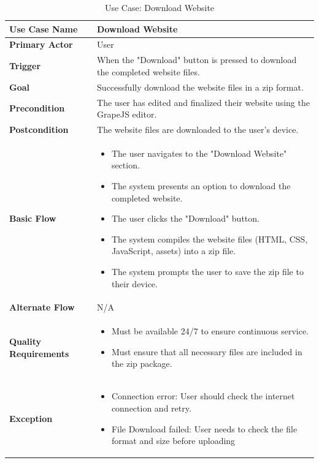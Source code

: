 \documentclass[12pt]{report}
\begin{document}
\clearpage
\begin{table}[h!]

\begin{tabular}{|p{3.5cm}|p{10cm}|}
\hline
\textbf{Use Case Name} & Download Website \\ 
\hline
\textbf{Primary Actor} & User  \\ 
\hline
\textbf{Trigger} & When the "Download" button is pressed to download the completed website files. \\ 
\hline
\textbf{Goal} & Successfully download the website files in a zip format. \\ 
\hline
\textbf{Precondition} & The user has edited and finalized their website using the GrapeJS editor. \\ 
\hline
\textbf{Postcondition} & The website files are downloaded to the user's device. \\ 
\hline
\textbf{Basic Flow} & 
\begin{itemize}
    \item The user navigates to the "Download Website" section.
    \item The system presents an option to download the completed website.
    \item The user clicks the "Download" button.
    \item The system compiles the website files (HTML, CSS, JavaScript, assets) into a zip file.
    \item The system prompts the user to save the zip file to their device.
\end{itemize} \\ 
\hline
\textbf{Alternate Flow} & N/A \\ 
\hline
\textbf{Quality Requirements} & 
\begin{itemize}
    \item Must be available 24/7 to ensure continuous service.
    \item Must ensure that all necessary files are included in the zip package.
\end{itemize} \\ 
\hline
\textbf{Exception} & 
\begin{itemize}
    \item Connection error: User should check the internet connection and retry.
    \item File Download failed: User needs to check the file format and size before uploading
\end{itemize} \\ 
\hline
\end{tabular}

\caption{Use Case: Download Website}
\end{table}
\end{document}

